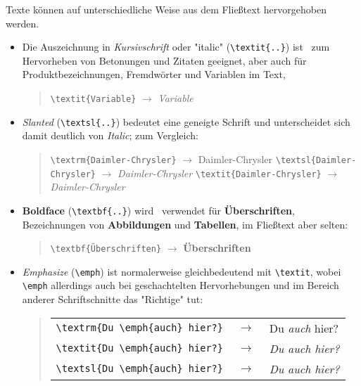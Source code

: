 Texte können auf unterschiedliche Weise aus dem Fließtext hervorgehoben werden.
%
\begin{itemize}
    \item Die Auszeichnung in \textit{Kursivschrift} oder "italic"
    (\verb!\textit{..}!) ist \va\ zum Hervorheben von Betonungen und Zitaten
    geeignet, aber auch für Produktbezeichnungen, Fremdwörter und Variablen
    im Text, \zB
    \begin{quote}
        \verb!\textit{Variable}! $\rightarrow$ \textit{Variable}
    \end{quote}

    \item \textsl{Slanted} %
    (\verb!\textsl{..}!) bedeutet eine geneigte Schrift und unterscheidet
    sich damit deutlich von \textit{Italic}; zum Vergleich:
    \begin{quote}
        \verb!\textrm{Daimler-Chrysler}! $\rightarrow$
        \textrm{Daimler-Chrysler} \newline%
        \verb!\textsl{Daimler-Chrysler}! $\rightarrow$
        \textsl{Daimler-Chrysler} \newline%
        \verb!\textit{Daimler-Chrysler}! $\rightarrow$ \textit{Daimler-Chrysler}
    \end{quote}
%
    \item \textbf{Boldface} (\verb!\textbf{..}!) wird \ia\ verwendet für
    \textbf{Überschriften}, Bezeichnungen von \textbf{Abbildungen} und
    \textbf{Tabellen}, im Fließtext aber selten:
    \begin{quote}
        \verb!\textbf{Überschriften}! $\rightarrow$ \textbf{Überschriften}
    \end{quote}
%
    \item \emph{Emphasize} (\verb!\emph!) %
    ist normalerweise gleichbedeutend mit \verb!\textit!, wobei
    \verb!\emph! allerdings auch bei geschachtelten Hervorhebungen und im
    Bereich anderer Schriftschnitte das "Richtige" tut:
    \begin{quote}
        \setlength{\tabcolsep}{0pt}%
        \begin{tabular}{lcl}
            \verb!\textrm{Du \emph{auch} hier?}! & $\;\rightarrow\;$ &
            \textrm{Du \emph{auch} hier?}
            \\
            \verb!\textit{Du \emph{auch} hier?}! & $\;\rightarrow\;$ &
            \textit{Du \emph{auch} hier?}
            \\
            \verb!\textsl{Du \emph{auch} hier?}! & $\;\rightarrow\;$ &
            \textsl{Du \emph{auch} hier?}

\end{tabular}
\end{quote}
\end{itemize}
